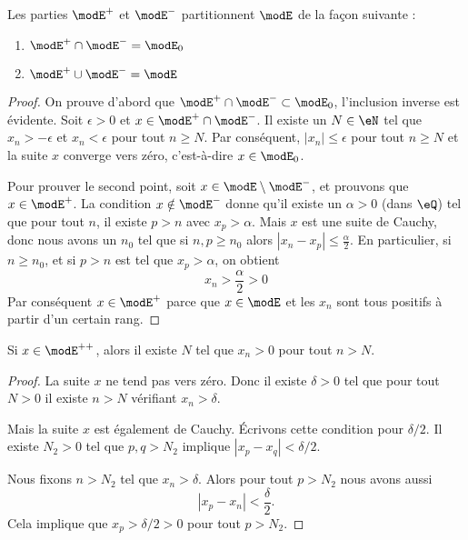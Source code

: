 \begin{lemma}       \label{LEMooSWYXooMKMLYI}
	Les parties \( \modE^+\) et \( \modE^-\) partitionnent \( \modE\) de la façon suivante :
	\begin{enumerate}
		\item
		      \( \modE^+\cap\modE^-=\modE_0\)
		\item       \label{ITEMooZRVXooANHspZ}
		      \( \modE^+\cup\modE^-=\modE\)
	\end{enumerate}
\end{lemma}

\begin{proof}
	On prouve d'abord que \( \modE^+\cap\modE^-\subset\modE_0\), l'inclusion inverse est évidente. Soit \( \epsilon>0\) et \( x\in \modE^+\cap\modE^-\). Il existe un \( N\in \eN\) tel que \( x_n>-\epsilon\) et \( x_n<\epsilon\) pour tout \( n\geq N\). Par conséquent, \( | x_n |\leq \epsilon\) pour tout \( n\geq N\) et la suite \( x\) converge vers zéro, c'est-à-dire \( x\in\modE_0\).

	Pour prouver le second point, soit \( x\in \modE\setminus\modE^-\), et prouvons que \( x\in\modE^+\). La condition \( x\notin \modE^-\) donne qu'il existe un \( \alpha>0\) (dans \( \eQ\)) tel que pour tout \( n\), il existe \( p>n\) avec \( x_p>\alpha\). Mais \( x\) est une suite de Cauchy, donc nous avons un \( n_0\) tel que si \( n,p\geq n_0\) alors \( | x_n-x_p |\leq \frac{ \alpha }{2}\). En particulier, si \( n\geq n_0\), et si \( p>n\) est tel que \( x_p>\alpha\), on obtient
	\begin{equation}
		x_n>\frac{ \alpha }{2}>0
	\end{equation}
	Par conséquent \( x\in\modE^+\) parce que \( x\in\modE\) et les \( x_n \) sont tous positifs à partir d'un certain rang.
\end{proof}

\begin{lemma}        \label{LEMooXNWSooHbNcAV}
	Si \( x\in \modE^{++}\), alors il existe \( N\) tel que \( x_n>0\) pour tout \( n>N\).
\end{lemma}

\begin{proof}
	La suite \( x\) ne tend pas vers zéro. Donc il existe \( \delta>0\) tel que pour tout \( N>0\) il existe \( n>N\) vérifiant \( x_n>\delta\).

	Mais la suite \( x\) est également de Cauchy. Écrivons cette condition pour \( \delta/2\). Il existe \( N_2>0\) tel que \( p,q>N_2\) implique \( | x_p-x_q |<\delta/2\).

	Nous fixons \( n>N_2\) tel que \( x_n>\delta\). Alors pour tout \( p>N_2\) nous avons aussi
	\begin{equation}
		| x_p-x_n |<\frac{ \delta }{2}.
	\end{equation}
	Cela implique que \( x_p>\delta/2>0\) pour tout \( p>N_2\).
\end{proof}

